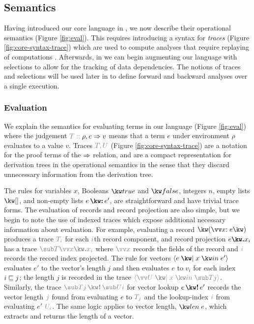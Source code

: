 \subsection{Semantics}

Having introduced our core language in , we now describe their operational semantics (Figure \ref{fig:eval}). This requires introducing a syntax for \textit{traces} (Figure \ref{fig:core-syntax-trace}) which are used to compute analyses that require replaying of computations \cite{perera12a}. Afterwards, in  we can begin augmenting our language with selections to allow for the tracking of data dependencies. The notions of traces and selections will be used later in  to define forward and backward analyses over a single execution.


\subsubsection{Evaluation}
\label{sec:core-language:eval}






We explain the semantics for evaluating terms in our language (Figure \ref{fig:eval}) where the judgement $\explVal{T}{\rho, e \evalR v}$ means that a term $e$ under environment $\rho$ evaluates to a value $v$. Traces $\textcolor{gray}{T, U}$ (Figure \ref{fig:core-syntax-trace}) are a notation for the proof terms of the $\Rightarrow$ relation, and are a compact representation for derivation trees in the operational semantics in the sense that they discard unnecessary information from the derivation tree.

The rules for variables $x$, Booleans $\exTrue$ and $\exFalse$, integers $n$, empty lists $\exNil$, and non-empty lists $\exCons{e}{e'}$, are straightforward and have trivial trace forms. The evaluation of records and record projection are also simple, but we begin to note the use of indexed traces which expose additional necessary information about evaluation. For example, evaluating a record $\exRec{\vec{\bind{x}{e}}}$ produces a trace $\textcolor{gray}{T_i}$ for each $\textcolor{gray}{i}$th record component, and record projection $\exRecProj{e}{x_i}$ has a trace $\textcolor{gray}{\trRecProj{T}{\vec{x}}{x_i}}$ where $\textcolor{gray}{\vec{x}}$ records the fields of the record and $\textcolor{gray}{i}$ records the record index projected. The rule for vectors $\exVec{e}{x}{e'}$ evaluates $e'$ to the vector's length $j$ and then evaluates $e$ to $v_i$ for each index $i \numleq j$; the length $j$ is recorded in the trace $\textcolor{gray}{\trVec{\vec{U}}{x}{T}{j}}$. Similarly, the trace $\textcolor{gray}{\trVecLookup{T}{j}{U}{i}}$ for vector lookup $\exVecLookup{e}{e'}$ records the vector length $\textcolor{gray}{j}$ found from evaluating $e$ to $\textcolor{gray}{T_j}$ and the lookup-index $\textcolor{gray}{i}$ from evaluating $e'$ $\textcolor{gray}{U_i}$. The same logic applies to vector length, $\exVecLen{e}$, which extracts and returns the length of a vector.

